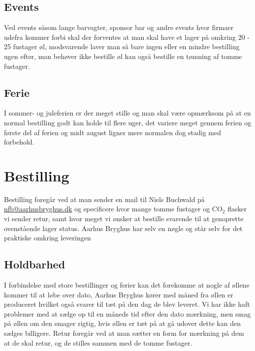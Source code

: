 \subsection*{Events}

Ved events såsom lange barvagter, sponsor bar og andre events hvor firmaer udefra kommer forbi skal der forventes
at man skal have et lager på omkring 20 - 25 fustager øl, modsvarende laver man så bare ingen
eller en mindre bestilling ugen efter, man behøver ikke bestille øl kan også bestille en tømning af tomme fustager.

\subsection*{Ferie}

I sommer- og juleferien er der meget stille og man skal være opmærksom på at en normal bestilling
godt kan holde til flere uger, det variere meget gennem ferien og første del af ferien og
midt august ligner mere normalen dog stadig med forbehold.


\section{Bestilling}

Bestilling foregår ved at man sender en mail til Niels Buchwald på \\
\href{mailto:nfb@aarhusbryghus.dk}{nfb@aarhusbryghus.dk} og specificere hvor mange tomme fustager
og CO$_{2}$ flasker vi sender retur, samt hvor meget vi
ønsker at bestille svarende til at genoprette ovenstående lager status.
Aarhus Bryghus har selv en nøgle og står selv for det praktiske omkring leveringen

\subsection{Holdbarhed}

I forbindelse med store bestillinger og ferier kan det forekomme at nogle af øllene kommer til at løbe over dato,
Aarhus Bryghus kører med måned fra øllen er produceret hvilket også svarer til tæt på den dag de blev leveret.
Vi har ikke haft problemer med at sælge op til en måneds tid efter den dato mærkning, men smag på øllen
om den smager rigtig, hvis øllen er tæt på at gå udover dette kan den sælges billigere.
Retur foregår ved at man sætter en form for mærkning på dem at de skal retur, og de stilles sammen
med de tomme fustager.

